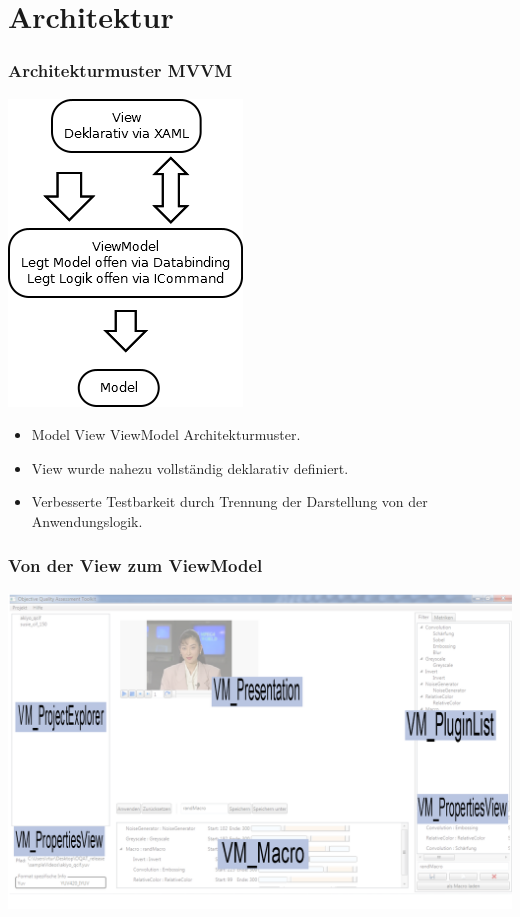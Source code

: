 \documentclass[t]{beamer}
\begin{document}
\section{Architektur}
\begin{frame}
\frametitle{Architekturmuster  MVVM}
\begin{minipage}{5,5cm}
\includegraphics[scale=.5]{img/arch/mvvm.png}
\end{minipage}
\begin{minipage}{5,5cm}
\begin{itemize}
\item <+-> Model View ViewModel Architekturmuster.
\item <+-> View wurde nahezu vollständig deklarativ definiert.
\item <+-> Verbesserte Testbarkeit durch Trennung der Darstellung von der Anwendungslogik.
\end{itemize}
\end{minipage}
\end{frame}
\begin{frame}
\frametitle{Von der View zum ViewModel}
\includegraphics[scale=.23]{img/arch/generalOverview.png}
\end{frame}
\end{document}
